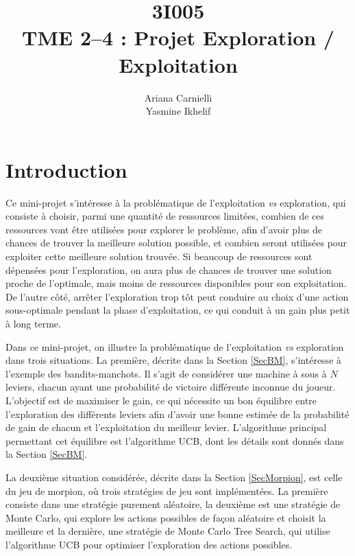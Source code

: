 \documentclass[a4paper,11pt]{article}
\begin{document}
\pagestyle{plain}

\title{3I005 \\ TME 2--4 : Projet Exploration / Exploitation}
\author{Ariana Carnielli \\ Yasmine Ikhelif}
\date{}

\maketitle

\sloppy

\tableofcontents

\section{Introduction}

Ce mini-projet s'intéresse à la problématique de l'exploitation \emph{vs} exploration, qui consiste à choisir, parmi une quantité de ressources limitées, combien de ces ressources vont être utilisées pour explorer le problème, afin d'avoir plus de chances de trouver la meilleure solution possible, et combien seront utilisées pour exploiter cette meilleure solution trouvée. Si beaucoup de ressources sont dépensées pour l'exploration, on aura plus de chances de trouver une solution proche de l'optimale, mais moins de ressources disponibles pour son exploitation. De l'autre côté, arrêter l'exploration trop tôt peut conduire au choix d'une action sous-optimale pendant la phase d'exploitation, ce qui conduit à un gain plus petit à long terme.

Dans ce mini-projet, on illustre la problématique de l'exploitation \emph{vs} exploration dans trois situations. La première, décrite dans la Section \ref{SecBM}, s'intéresse à l'exemple des bandits-manchots. Il s'agit de considérer une machine à sous à $N$ leviers, chacun ayant une probabilité de victoire différente inconnue du joueur. L'objectif est de maximiser le gain, ce qui nécessite un bon équilibre entre l'exploration des différents leviers afin d'avoir une bonne estimée de la probabilité de gain de chacun et l'exploitation du meilleur levier. L'algorithme principal permettant cet équilibre est l'algorithme UCB, dont les détails sont donnés dans la Section \ref{SecBM}.

La deuxième situation considérée, décrite dans la Section \ref{SecMorpion}, est celle du jeu de morpion, où trois stratégies de jeu sont implémentées. La première consiste dans une stratégie purement aléatoire, la deuxième est une stratégie de Monte Carlo, qui explore les actions possibles de façon aléatoire et choisit la meilleure et la dernière, une stratégie de Monte Carlo Tree Search, qui utilise l'algorithme UCB pour optimiser l'exploration des actions possibles.
\end{document}
